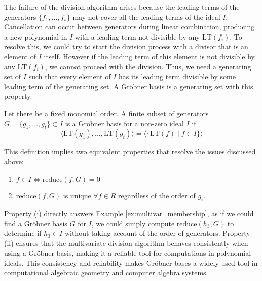 The failure of the division algorithm arises because the leading terms of the generators $\{f_1, \dots, f_s\}$ may not cover all the leading terms of the ideal $I$. Cancellation can occur between generators during linear combination, producing a new polynomial in $I$ with a leading term not divisible by any $\text{LT}(f_i)$. To resolve this, we could try to start the division process with a divisor that is an element of $I$ itself. However if the leading term of this element is not divisible by any $\text{LT}(f_i)$, we cannot proceed with the division. Thus, we need a generating set of $I$ such that every element of $I$ has its leading term divisible by some leading term of the generating set. A Gröbner basis is a generating set with this property.

\begin{definition}
\label{def:grobner_basis}
Let there be a fixed monomial order. A finite subset of generators $G = \{g_1, \dots, g_t\} \subset I$ is a Gröbner basis for a non-zero ideal $I$ if 
$$
\langle \text{LT}(g_1), \dots, \text{LT}(g_t) \rangle = \langle \{ \text{LT}(f) \mid f \in I \} \rangle
$$
\end{definition}

This definition implies two equivalent properties that resolve the issues discussed above:
\begin{center}
    \begin{varwidth}{\textwidth}
        \begin{enumerate}[label=(\roman*), font=\itshape]
            \item $f \in I \iff \text{reduce}(f, G) = 0$
            \item $\text{reduce}(f, G)$ is unique $\forall f \in R$ regardless of the order of $g_i$.
        \end{enumerate}
    \end{varwidth}
\end{center}

Property (i) directly answers Example \ref{ex:multivar_membership}, as if we could find a Gröbner basis $G$ for $I$, we could simply compute $\text{reduce}(h_3, G)$ to determine if $h_3 \in I$ without taking account of the order of generators. Property (ii) ensures that the multivariate division algorithm behaves consistently when using a Gröbner basis, making it a reliable tool for computations in polynomial ideals. This consistency and reliability makes Gröbner bases a widely used tool in computational algebraic geometry and computer algebra systems.

